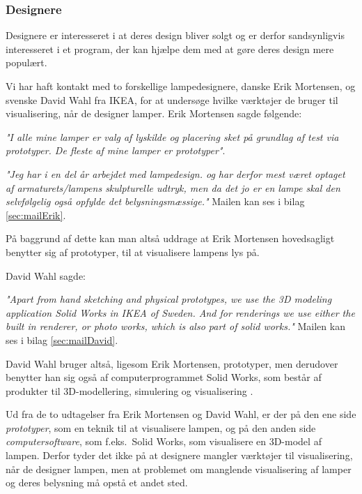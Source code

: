 \subsubsection{Designere}
Designere er interesseret i at deres design bliver solgt og er derfor sandsynligvis interesseret i et program, der kan hjælpe dem med at gøre deres design mere populært.
 
Vi har haft kontakt med to forskellige lampedesignere, danske Erik Mortensen, og svenske David Wahl fra IKEA, for at undersøge hvilke værktøjer de bruger til visualisering, når de designer lamper. Erik Mortensen sagde følgende: 
\begin{center}
\textit{"I alle mine lamper er valg af lyskilde og placering sket på grundlag af test via prototyper. De fleste af mine lamper er prototyper"}.

\textit{"Jeg har i en del år arbejdet med lampedesign. og har derfor mest været optaget af armaturets/lampens skulpturelle udtryk, men da det jo er en lampe skal den selvfølgelig  også opfylde det belysningsmæssige."} Mailen kan ses i bilag \ref{sec:mailErik}.
\end{center}

På baggrund af dette kan man altså uddrage at Erik Mortensen hovedsagligt benytter sig af prototyper, til at visualisere lampens lys på.

David Wahl sagde:
\begin{center}
\textit{"Apart from hand sketching and physical prototypes, we use the 3D modeling application Solid Works in IKEA of Sweden. And for renderings we use either the built in renderer, or photo works, which is also part of solid works."} Mailen kan ses i bilag \ref{sec:mailDavid}.
\end{center}

David Wahl bruger altså, ligesom Erik Mortensen, prototyper, men derudover benytter han sig også af computerprogrammet Solid Works, som består af produkter til 3D-modellering, simulering og visualisering \cite{solidworks}.

Ud fra de to udtagelser fra Erik Mortensen og David Wahl, er der på den ene side \textit{prototyper}, som en teknik til at visualisere lampen, og på den anden side \textit{computersoftware}, som f.eks.\ Solid Works, som visualisere en 3D-model af lampen. Derfor tyder det ikke på at designere mangler værktøjer til visualisering, når de designer lampen, men at problemet om manglende visualisering af lamper og deres belysning må opstå et andet sted.

